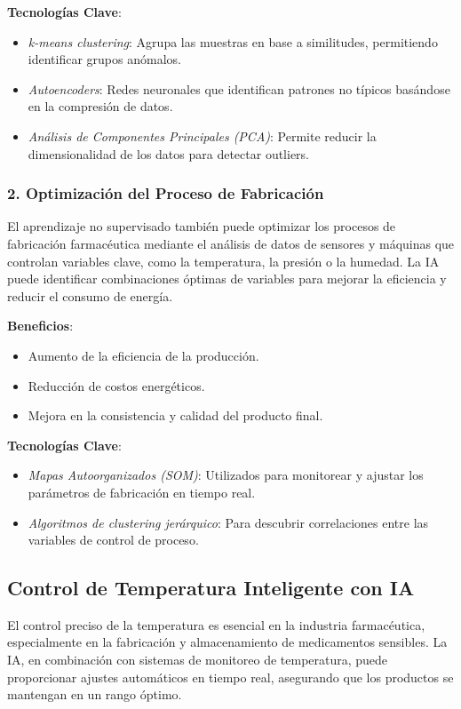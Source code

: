 \textbf{Tecnologías Clave}:
\begin{itemize}
    \item \textit{k-means clustering}: Agrupa las muestras en base a similitudes, permitiendo identificar grupos anómalos.
    \item \textit{Autoencoders}: Redes neuronales que identifican patrones no típicos basándose en la compresión de datos.
    \item \textit{Análisis de Componentes Principales (PCA)}: Permite reducir la dimensionalidad de los datos para detectar outliers.
\end{itemize}

\subsubsection{2. Optimización del Proceso de Fabricación}

El aprendizaje no supervisado también puede optimizar los procesos de fabricación farmacéutica mediante el análisis de datos de sensores y máquinas que controlan variables clave, como la temperatura, la presión o la humedad. La IA puede identificar combinaciones óptimas de variables para mejorar la eficiencia y reducir el consumo de energía.

\textbf{Beneficios}:
\begin{itemize}
    \item Aumento de la eficiencia de la producción.
    \item Reducción de costos energéticos.
    \item Mejora en la consistencia y calidad del producto final.
\end{itemize}

\textbf{Tecnologías Clave}:
\begin{itemize}
    \item \textit{Mapas Autoorganizados (SOM)}: Utilizados para monitorear y ajustar los parámetros de fabricación en tiempo real.
    \item \textit{Algoritmos de clustering jerárquico}: Para descubrir correlaciones entre las variables de control de proceso.
\end{itemize}

\subsection{Control de Temperatura Inteligente con IA}

El control preciso de la temperatura es esencial en la industria farmacéutica, especialmente en la fabricación y almacenamiento de medicamentos sensibles. La IA, en combinación con sistemas de monitoreo de temperatura, puede proporcionar ajustes automáticos en tiempo real, asegurando que los productos se mantengan en un rango óptimo.

